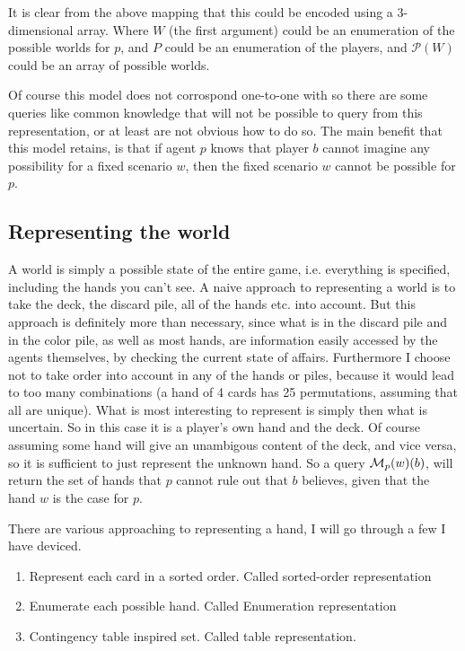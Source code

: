 It is clear from the above mapping that this could be encoded using a 3-dimensional array. Where $W$ (the first argument) could be an enumeration of the possible worlds for $p$, and $P$ could be an enumeration of the players, and $\mathcal{P}(W)$ could be an array of possible worlds.

Of course this model does not corrospond one-to-one with \KTfourfiveN so there are some queries like common knowledge that will not be possible to query from this representation, or at least are not obvious how to do so. The main benefit that this model retains, is that if agent $p$ knows that player $b$ cannot imagine any possibility for a fixed scenario $w$, then the fixed scenario $w$ cannot be possible for $p$.



\subsection{Representing the world} \label{sec:representing-a-world}
A world is simply a possible state of the entire game, i.e. everything is specified, including the hands you can't see. A naive approach to representing a world is to take the deck, the discard pile, all of the hands etc. into account. But this approach is definitely more than necessary, since what is in the discard pile and in the color pile, as well as most hands, are information easily accessed by the agents themselves, by checking the current state of affairs. Furthermore I choose not to take order into account in any of the hands or piles, because it would lead to too many combinations (a hand of 4 cards has 25 permutations, assuming that all are unique). What is most interesting to represent is simply then what is uncertain. So in this case it is a player's own hand and the deck. Of course assuming some hand will give an unambigous content of the deck, and vice versa, so it is sufficient to just represent the unknown hand. So a query $\mathcal{M}_p(w)(b)$, will return the set of hands that $p$ cannot rule out that $b$ believes, given that the hand $w$ is the case for $p$.

There are various approaching to representing a hand, I will go through a few I have deviced. 

\begin{enumerate}
\item Represent each card in a sorted order. Called sorted-order representation
\item Enumerate each possible hand. Called Enumeration representation
\item Contingency table inspired set. Called table representation.
\end{enumerate}

